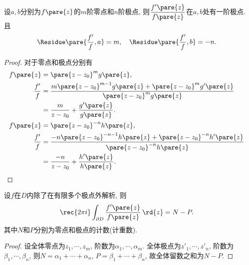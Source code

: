 \documentclass[../ComplexVariable.tex]{subfiles}
\begin{document}
\begin{proposition}
    设$a,b$分别为$f\pare{z}$的$m$阶零点和$n$阶极点, 则$\displaystyle \frac{f'\pare{z}}{f\pare{z}}$在$a,b$处有一阶极点. 且
    \[ \Residue \pare{\frac{f'}{f}, a} = m,\quad \Residue \pare{\frac{f'}{f}, b} = -n. \]
\end{proposition}
\begin{proof}对于零点和极点分别有
    \begin{align*}
        f\pare{z} &= \pare{z-z_0}^m g\pare{z}, \\
        \frac{f'}{f} &= \frac{m\pare{z-z_0}^{m-1}g\pare{z} + \pare{z-z_0}^m g'\pare{z}}{\pare{z-z_0}^m g\pare{z}} \\
        &= \frac{m}{z-z_0} + \frac{g'\pare{z}}{g\pare{z}}. \\
        f\pare{z} &= \pare{z-z_0}^{-n} h\pare{z}, \\
        \frac{f'}{f} &= \frac{-n\pare{z-z_0}^{-n-1}h\pare{z} + \pare{z-z_0}^{-n}h'\pare{z}}{\pare{z-z_0}^{-n} h\pare{z}} \\
        &= \frac{-n}{z-z_0} + \frac{h'\pare{z}}{h\pare{z}}. \qedhere
    \end{align*}
\end{proof}
\begin{theorem}[有极点的辐角原理]
    设$f$在$D$内除了在有限多个极点外解析, 则
    \[ \rec{2\pi i} \int_{\partial D} \frac{f'\pare{z}}{f\pare{z}}\,\rd{z} = N - P. \]
    其中$N$和$P$分别为零点和极点的计数(计重数).
\end{theorem}
\begin{proof}
    设全体零点为$z_1,\cdots, z_m$, 阶数为$\alpha_1,\cdots, \alpha_m$. 全体极点为$z'_1,\cdots, z'_n$, 阶数为$\beta_1,\cdots, \beta_n$, 则$N = \alpha_1+\cdots+\alpha_n$, $P=\beta_1+\cdots+\beta_n$, 故全体留数之和为$N-P$.
\end{proof}
\begin{figure}[ht]
    \centering
    \caption{}
    \label{fig:零点计数例1图}
\end{figure}
\end{document}
